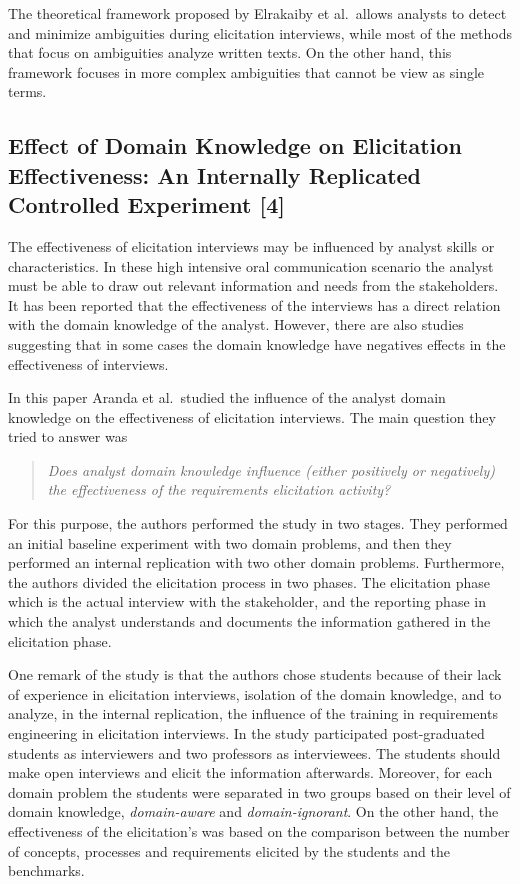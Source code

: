 \documentclass[]{llncs}
\begin{document}
The theoretical framework proposed by Elrakaiby et al.~allows analysts
to detect and minimize ambiguities during elicitation interviews, while
most of the methods that focus on ambiguities analyze written texts. On
the other hand, this framework focuses in more complex ambiguities that
cannot be view as single terms.

\hypertarget{effect-of-domain-knowledge-on-elicitation-effectiveness-an-internally-replicated-controlled-experiment-aranda2016effect}{%
\subsection{Effect of Domain Knowledge on Elicitation Effectiveness: An
Internally Replicated Controlled Experiment
{[}4{]}}\label{effect-of-domain-knowledge-on-elicitation-effectiveness-an-internally-replicated-controlled-experiment-aranda2016effect}}

The effectiveness of elicitation interviews may be influenced by analyst
skills or characteristics. In these high intensive oral communication
scenario the analyst must be able to draw out relevant information and
needs from the stakeholders. It has been reported that the effectiveness
of the interviews has a direct relation with the domain knowledge of the
analyst. However, there are also studies suggesting that in some cases
the domain knowledge have negatives effects in the effectiveness of
interviews.

In this paper Aranda et al.~studied the influence of the analyst domain
knowledge on the effectiveness of elicitation interviews. The main
question they tried to answer was

\begin{quote}
\emph{Does analyst domain knowledge influence (either positively or
negatively) the effectiveness of the requirements elicitation activity?}
\end{quote}

For this purpose, the authors performed the study in two stages. They
performed an initial baseline experiment with two domain problems, and
then they performed an internal replication with two other domain
problems. Furthermore, the authors divided the elicitation process in
two phases. The elicitation phase which is the actual interview with the
stakeholder, and the reporting phase in which the analyst understands
and documents the information gathered in the elicitation phase.

One remark of the study is that the authors chose students because of
their lack of experience in elicitation interviews, isolation of the
domain knowledge, and to analyze, in the internal replication, the
influence of the training in requirements engineering in elicitation
interviews. In the study participated post-graduated students as
interviewers and two professors as interviewees. The students should
make open interviews and elicit the information afterwards. Moreover,
for each domain problem the students were separated in two groups based
on their level of domain knowledge, \emph{domain-aware} and
\emph{domain-ignorant}. On the other hand, the effectiveness of the
elicitation's was based on the comparison between the number of
concepts, processes and requirements elicited by the students and the
benchmarks.
\end{document}
